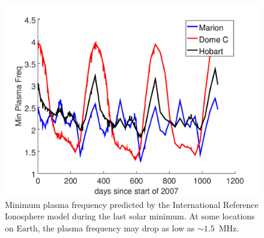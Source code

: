 \documentclass{ws-jai}
\begin{document}
\begin{figure}
  \begin{center}
    \includegraphics[width=0.63\linewidth]{Figures/marion_domec_hobart.png}
    \caption{Minimum plasma frequency predicted by the International
      Reference Ionosphere model during the last solar minimum.  At
      some locations on Earth, the plasma frequency may drop as low as
      $\sim1.5$~MHz.}
    \label{Fig:iri}
  \end{center}
\end{figure}
\end{document}
